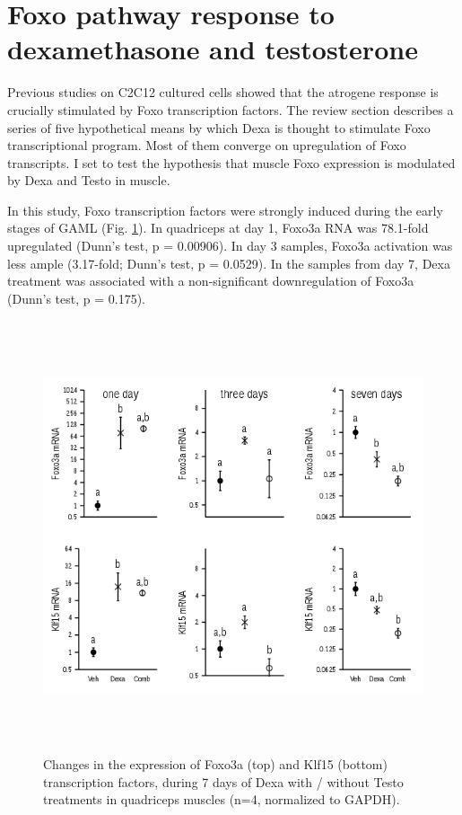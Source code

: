 \documentclass[12pt,english]{report}\usepackage[]{graphicx}\usepackage[]{color}
\newenvironment{knitrout}{}{} %
\begin{document}
\section{Foxo pathway response to dexamethasone and testosterone}

Previous studies on C2C12 cultured cells showed that the atrogene
response is crucially stimulated by Foxo transcription factors. The
review section describes a series of five hypothetical means by which
Dexa is thought to stimulate Foxo transcriptional program. Most of
them converge on upregulation of Foxo transcripts. I set to test the
hypothesis that muscle Foxo expression is modulated by Dexa and Testo
in muscle.

In this study, Foxo transcription factors were strongly induced during
the early stages of GAML (Fig. \ref{fig:Foxo-expression}). In quadriceps
at day 1, Foxo3a RNA was 78.1-fold
upregulated (Dunn's test, p = 0.00906).
In day 3 samples, Foxo3a activation was less ample (3.17-fold;
Dunn's test, p = 0.0529).
In the samples from day 7, Dexa treatment was associated with a non-significant
downregulation of Foxo3a (Dunn's test, p = 0.175).

\begin{figure}
\begin{knitrout}
\color{fgcolor}
\includegraphics[width=6in,height=5in]{figure/foxogene-1} 

\end{knitrout}

\protect\caption[Changes in the expression of Foxo3a and Klf15 transcription factors
during Dexa with / without Testo treatments.]{Changes in the expression of Foxo3a (top) and Klf15 (bottom) transcription
factors, during 7 days of Dexa with / without Testo treatments in
quadriceps muscles (n=4, normalized to GAPDH).\label{fig:Foxo-expression}}


\end{figure}
\end{document}
